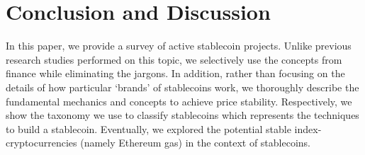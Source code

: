 \section{Conclusion and Discussion}

In this paper, we provide a survey of active stablecoin projects. Unlike previous research studies performed on this topic, we selectively use the concepts from finance while eliminating the jargons. In addition, rather than focusing on the details of how particular `brands' of stablecoins work, we thoroughly describe the fundamental mechanics and concepts to achieve price stability. Respectively, we show the taxonomy we use to classify stablecoins which represents the techniques to build a stablecoin. Eventually, we explored the potential stable index-cryptocurrencies (namely Ethereum gas) in the context of stablecoins.













